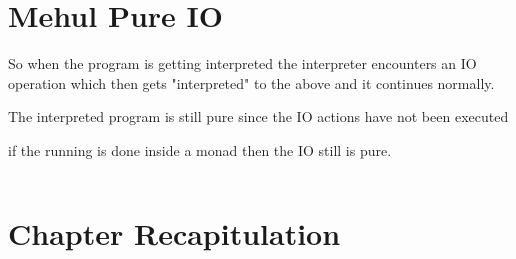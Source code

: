 \documentclass[thesis-solanki.tex]{subfiles}
\begin{document}
\section{Mehul Pure IO}

So when the program is getting interpreted the interpreter encounters an IO operation which then gets "interpreted" to the above and it 
continues normally.

The interpreted program is still pure since the IO actions have not been executed 

if the running is done inside a monad then the IO still is pure.


\begin{singlespace}
  \inputminted[linenos]{haskell}{haskell-proto4-platen-winkel.hs}
\end{singlespace}


\section{Chapter Recapitulation}

\ifMain
\begin{scope}
  \nolinenumbers
  \enotesize
  \par
  \begin{singlespace}
  \setlength{\parskip}{12pt plus 2pt minus 1pt}
  \theendnotes
  \par
  \end{singlespace}
\end{scope}
\fi
\end{document}

